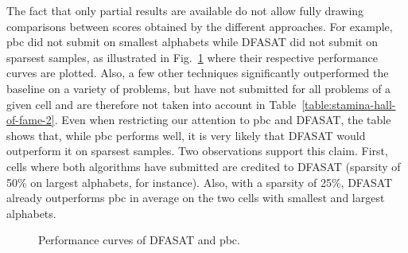 The fact that only partial results are available do not allow fully drawing comparisons between scores obtained by the different approaches. For example, pbc did not submit on smallest alphabets while DFASAT did not submit on sparsest samples, as illustrated in Fig.~\ref{image:stamina-winners-performance-comparison} where their respective performance curves are plotted. Also, a few other techniques significantly outperformed the baseline on a variety of problems, but have not submitted for all problems of a given cell and are therefore not taken into account in Table~\ref{table:stamina-hall-of-fame-2}. Even when restricting our attention to pbc and DFASAT, the table shows that, while pbc performs well, it is very likely that DFASAT would outperform it on sparsest samples. Two observations support this claim. First, cells where both algorithms have submitted are credited to DFASAT (sparsity of 50\% on largest alphabets, for instance). Also, with a sparsity of 25\%, DFASAT already outperforms pbc in average on the two cells with smallest and largest alphabets. 

\begin{figure}[ht]
\centering{}
  \caption{Performance curves of DFASAT and pbc\label{image:stamina-winners-performance-comparison}.}
\end{figure}

